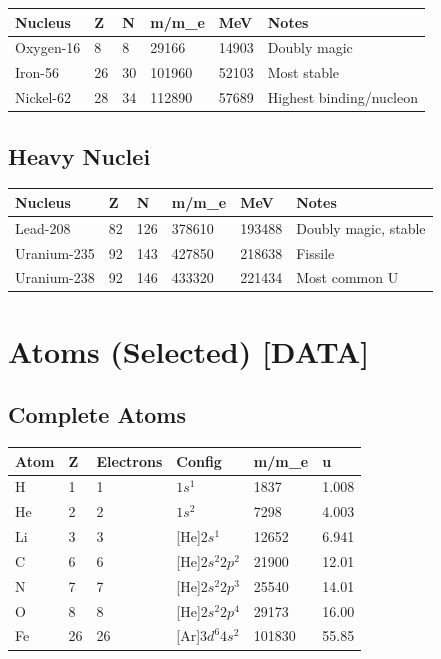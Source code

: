 \documentclass[
  11pt,
  letterpaper,
  twoside,
  openany]{book}
\makeatletter
\let\orig@section\section
\renewcommand{\section}{\needspace{8\baselineskip}\orig@section}
\let\orig@subsection\subsection
\renewcommand{\subsection}{\needspace{6\baselineskip}\orig@subsection}
\makeatother
\begin{document}
\begin{longtable}[]{@{}llllll@{}}
\toprule\noalign{}
Nucleus & Z & N & m/m\_e & MeV & Notes \\
\midrule\noalign{}
\endhead
\bottomrule\noalign{}
\endlastfoot
Oxygen-16 & 8 & 8 & 29166 & 14903 & Doubly magic \\
Iron-56 & 26 & 30 & 101960 & 52103 & Most stable \\
Nickel-62 & 28 & 34 & 112890 & 57689 & Highest binding/nucleon \\
\end{longtable}

\subsection{Heavy Nuclei}\label{heavy-nuclei}

\begin{longtable}[]{@{}llllll@{}}
\toprule\noalign{}
Nucleus & Z & N & m/m\_e & MeV & Notes \\
\midrule\noalign{}
\endhead
\bottomrule\noalign{}
\endlastfoot
Lead-208 & 82 & 126 & 378610 & 193488 & Doubly magic, stable \\
Uranium-235 & 92 & 143 & 427850 & 218638 & Fissile \\
Uranium-238 & 92 & 146 & 433320 & 221434 & Most common U \\
\end{longtable}

\section{Atoms (Selected) {[}DATA{]}}\label{atoms-selected-data}

\subsection{Complete Atoms}\label{complete-atoms}

\begin{longtable}[]{@{}llllll@{}}
\toprule\noalign{}
Atom & Z & Electrons & Config & m/m\_e & u \\
\midrule\noalign{}
\endhead
\bottomrule\noalign{}
\endlastfoot
H & 1 & 1 & \(1s^1\) & 1837 & 1.008 \\
He & 2 & 2 & \(1s^2\) & 7298 & 4.003 \\
Li & 3 & 3 & {[}He{]}\(2s^1\) & 12652 & 6.941 \\
C & 6 & 6 & {[}He{]}\(2s^2 2p^2\) & 21900 & 12.01 \\
N & 7 & 7 & {[}He{]}\(2s^2 2p^3\) & 25540 & 14.01 \\
O & 8 & 8 & {[}He{]}\(2s^2 2p^4\) & 29173 & 16.00 \\
Fe & 26 & 26 & {[}Ar{]}\(3d^6 4s^2\) & 101830 & 55.85 \\
\end{longtable}
\end{document}
